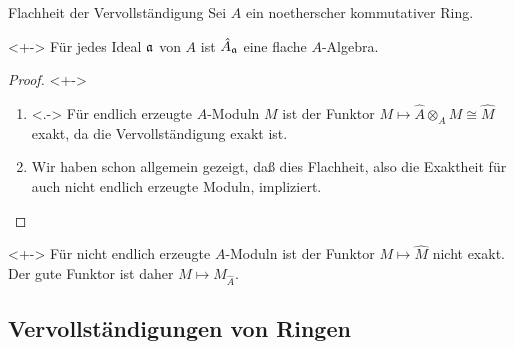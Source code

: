 \begin{frame}{Flachheit der Vervollständigung}
	Sei \(A\) ein noetherscher kommutativer Ring. 
	\begin{proposition}<+->
		Für jedes Ideal
		\(\mathfrak{a}\) von \(A\) ist \(\hat A_{\mathfrak{a}}\) eine
		flache \(A\)-Algebra.
	\end{proposition}
	\begin{proof}<+->
		\begin{enumerate}[<+->]
		\item<.->
			Für endlich erzeugte \(A\)-Moduln \(M\) ist der Funktor
			\(M \mapsto \hat A \otimes_A M \cong \hat M\) exakt, da die
			Vervollständigung exakt ist.
		\item
			Wir haben schon allgemein gezeigt, daß dies Flachheit, also
			die Exaktheit für auch nicht endlich erzeugte Moduln, impliziert.
			\qedhere
		\end{enumerate}
	\end{proof}
	\begin{remark}<+->
		Für nicht endlich erzeugte \(A\)-Moduln ist der Funktor \(M \mapsto
		\hat M\) nicht exakt. Der gute Funktor ist daher \(M \mapsto M_{\hat A}\).
	\end{remark}
\end{frame}

\subsection{Vervollständigungen von Ringen}

